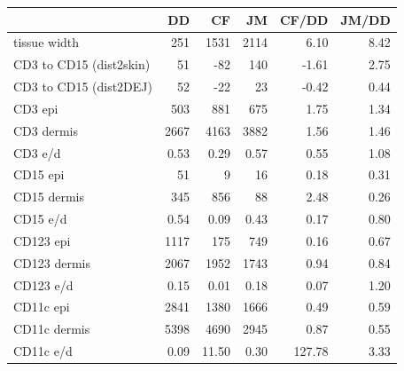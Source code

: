 \begin{tabular}{lrrrrr}
   \hline  &DD& CF& JM& CF/DD& JM/DD\\ 
\hline
tissue width & 251 & 1531 & 2114 &   6.10 & 8.42 \\ 
  CD3 to CD15 (dist2skin) & 51 & -82 & 140 &  -1.61 & 2.75 \\ 
  CD3 to CD15 (dist2DEJ) & 52 & -22 & 23 &  -0.42 & 0.44 \\ 
   \hline
CD3 epi & 503 & 881 & 675 &   1.75 & 1.34 \\ 
  CD3 dermis & 2667 & 4163 & 3882 &   1.56 & 1.46 \\ 
  CD3 e/d & 0.53 &  0.29 & 0.57 &   0.55 & 1.08 \\ 
   \hline
CD15 epi & 51 & 9 & 16 &   0.18 & 0.31 \\ 
  CD15 dermis & 345 & 856 & 88 &   2.48 & 0.26 \\ 
  CD15 e/d & 0.54 &  0.09 & 0.43 &   0.17 & 0.80 \\ 
   \hline
CD123 epi & 1117 & 175 & 749 &   0.16 & 0.67 \\ 
  CD123 dermis & 2067 & 1952 & 1743 &   0.94 & 0.84 \\ 
  CD123 e/d & 0.15 &  0.01 & 0.18 &   0.07 & 1.20 \\ 
   \hline
CD11c epi & 2841 & 1380 & 1666 &   0.49 & 0.59 \\ 
  CD11c dermis & 5398 & 4690 & 2945 &   0.87 & 0.55 \\ 
  CD11c e/d & 0.09 & 11.50 & 0.30 & 127.78 & 3.33 \\ 
   \hline
\end{tabular}
